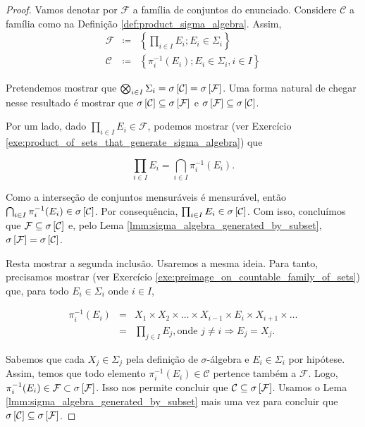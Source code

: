 \begin{proof}
    Vamos denotar por $\mathcal{F}$ a família de conjuntos do enunciado. Considere $\mathcal{C}$ a família como na Definição \ref{def:product_sigma_algebra}. Assim,
    \begin{eqnarray*}
        \mathcal{F} &\coloneq& \left\{\prod_{i\in I} E_i; E_i\in \Sigma_i\right\}\\
        \mathcal{C} &\coloneq& \left\{\pi_i^{-1}(E_i); E_i\in \Sigma_i, i\in I\right\}
    \end{eqnarray*}
    
    Pretendemos mostrar que  $\bigotimes_{i\in I} \Sigma_i=\sigma \left[\mathcal{C}\right]=\sigma \left[\mathcal{F}\right]$. Uma forma natural de chegar nesse resultado é mostrar que $\sigma \left[\mathcal{C}\right]\subseteq\sigma \left[\mathcal{F}\right]$ e $\sigma \left[\mathcal{F}\right]\subseteq\sigma \left[\mathcal{C}\right]$.
    
    Por um lado, dado $\prod_{i\in I} E_i\in \mathcal{F}$, podemos mostrar (ver Exercício \ref{exe:product_of_sets_that_generate_sigma_algebra}) que
    
    \begin{equation*}
        \prod_{i\in I} E_i = \bigcap_{i\in I} \pi_{i}^{-1} (E_i).
    \end{equation*}
    
    Como a interseção de conjuntos mensuráveis é mensurável, então $\bigcap_{i\in I} \pi_{i}^{-1} (E_i) \in \sigma \left[\mathcal{C}\right]$. Por consequência, $\prod_{i\in I} E_i\in \sigma \left[\mathcal{C}\right]$. Com isso, concluímos que $\mathcal{F} \subseteq \sigma \left[\mathcal{C}\right]$ e, pelo Lema \ref{lmm:sigma_algebra_generated_by_subset}, $\sigma \left[\mathcal{F}\right]=\sigma \left[\mathcal{C}\right]$.
    
    Resta mostrar a segunda inclusão. Usaremos a mesma ideia. Para tanto, precisamos mostrar (ver Exercício \ref{exe:preimage_on_countable_family_of_sets}) que, para todo $E_i\in\Sigma_i$ onde $i\in I$,
    
    \begin{eqnarray*}
        \pi_{i}^{-1} (E_i) 
        &=& X_1 \times X_2 \times \dots \times X_{i-1} \times E_i \times X_{i+1}\times\dots \\
        &=& \prod_{j\in I} E_j, \text{onde } j\neq i \Rightarrow E_j=X_j.
    \end{eqnarray*}
    
    Sabemos que cada $X_j\in\Sigma_j$ pela definição de $\sigma$-álgebra e $E_i\in\Sigma_i$ por hipótese. Assim, temos que todo elemento $\pi_{i}^{-1} (E_i)\in \mathcal{C}$ pertence também a $\mathcal{F}$. Logo, $\pi_{i}^{-1} (E_i) \in \mathcal{F} \subset \sigma \left[\mathcal{F}\right]$. Isso nos permite concluir que $\mathcal{C} \subseteq \sigma \left[\mathcal{F}\right]$. Usamos o Lema \ref{lmm:sigma_algebra_generated_by_subset} mais uma vez para concluir que $\sigma \left[\mathcal{C}\right]\subseteq\sigma \left[\mathcal{F}\right]$.


\end{proof}
